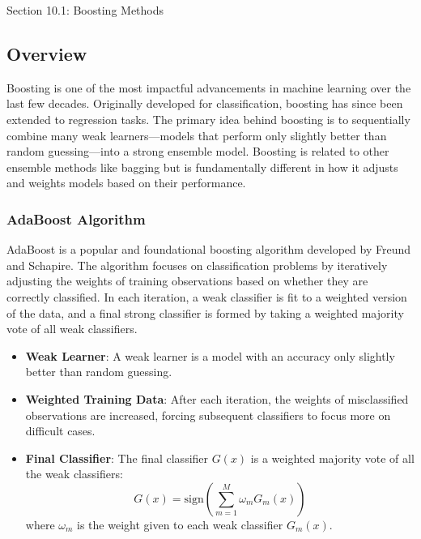 \begin{notes}{Section 10.1: Boosting Methods}
    \subsection*{Overview}

    Boosting is one of the most impactful advancements in machine learning over the last few decades. Originally developed for classification, boosting has since been extended to regression tasks. 
    The primary idea behind boosting is to sequentially combine many weak learners—models that perform only slightly better than random guessing—into a strong ensemble model. Boosting is related to other 
    ensemble methods like bagging but is fundamentally different in how it adjusts and weights models based on their performance.
    
    \subsubsection*{AdaBoost Algorithm}
    
    AdaBoost is a popular and foundational boosting algorithm developed by Freund and Schapire. The algorithm focuses on classification problems by iteratively adjusting the weights of training 
    observations based on whether they are correctly classified. In each iteration, a weak classifier is fit to a weighted version of the data, and a final strong classifier is formed by taking a 
    weighted majority vote of all weak classifiers.
    
    \begin{highlight}
        \begin{itemize}
            \item \textbf{Weak Learner}: A weak learner is a model with an accuracy only slightly better than random guessing.
            \item \textbf{Weighted Training Data}: After each iteration, the weights of misclassified observations are increased, forcing subsequent classifiers to focus more on difficult cases.
            \item \textbf{Final Classifier}: The final classifier \(G(x)\) is a weighted majority vote of all the weak classifiers:
            \[
            G(x) = \text{sign} \left( \sum_{m=1}^{M} \omega_m G_m(x) \right)
            \]
            where \(\omega_m\) is the weight given to each weak classifier \(G_m(x)\).
        \end{itemize}
    \end{highlight}
    

\end{notes}
